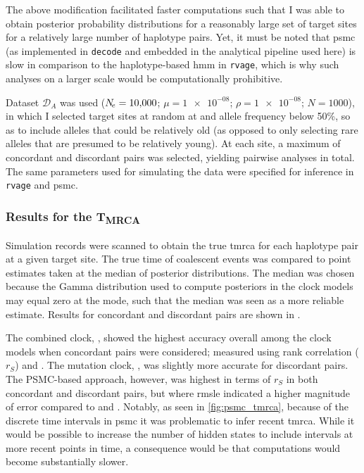 The above modification facilitated faster computations such that I was able to obtain posterior probability distributions for a reasonably large set of target sites for a relatively large number of haplotype pairs.
Yet, it must be noted that \gls{psmc} (as implemented in \texttt{decode} and embedded in the analytical pipeline used here) is slow in comparison to the haplotype-based \gls{hmm} in \texttt{rvage}, which is why such analyses on a larger scale would be computationally prohibitive.

Dataset $\mathcal{D}_A$ was used (${N_{\!e}=\num{10000}}$; ${\mu=\num{1e-08}}$; ${\rho=\num{1e-08}}$; ${N=\num{1000}}$), in which I selected  target sites at random at  and allele frequency below 50\%, so as to include alleles that could be relatively old (as opposed to only selecting rare alleles that are presumed to be relatively young).
At each site, a maximum of  concordant and  discordant pairs was selected, yielding  pairwise analyses in total.
The same parameters used for simulating the data were specified for inference in \texttt{rvage} and \gls{psmc}.


%
\subsubsection{Results for the T\textsubscript{MRCA}}
%

Simulation records were scanned to obtain the true \gls{tmrca} for each haplotype pair at a given target site.
The true time of coalescent events was compared to point estimates taken at the median of posterior distributions.
The median was chosen because the Gamma distribution used to compute posteriors in the clock models may equal zero at the mode, such that the median was seen as a more reliable estimate.
Results for concordant and discordant pairs are shown in .

%

%

The combined clock, \ClockC, showed the highest accuracy overall among the clock models when concordant pairs were considered; measured using rank correlation ($r_S$) and .
The mutation clock, \ClockM, was slightly more accurate for discordant pairs.
The PSMC-based approach, however, was highest in terms of $r_S$ in both concordant and discordant pairs, but where \gls{rmsle} indicated a higher magnitude of error compared to \ClockC and \ClockM.
Notably, as seen in \cref{fig:psmc_tmrca}, because of the discrete time intervals in \gls{psmc} it was problematic to infer recent \gls{tmrca}.
While it would be possible to increase the number of hidden states to include intervals at more recent points in time, a consequence would be that computations would become substantially slower.

